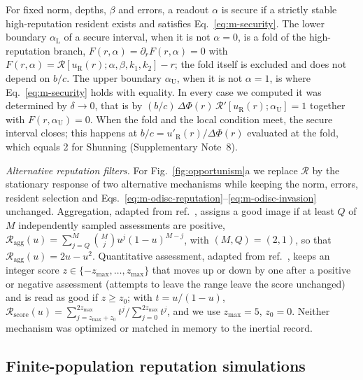 For fixed norm, depths, $\beta$ and errors, a readout $\alpha$ is secure if a
strictly stable high-reputation resident exists and satisfies
Eq.~\eqref{eq:m-security}. The lower boundary $\alpha_{\mathrm L}$ of a secure
interval, when it is not $\alpha=0$, is a fold of the high-reputation branch,
$F(r,\alpha)=\partial_rF(r,\alpha)=0$ with
$F(r,\alpha)=\mathcal R[u_{\mathrm R}(r);\alpha,\beta,k_1,k_2]-r$; the fold
itself is excluded and does not depend on $b/c$. The upper boundary
$\alpha_{\mathrm U}$, when it is not $\alpha=1$, is where
Eq.~\eqref{eq:m-security} holds with equality. In every case we computed it was
determined by $\delta\to0$, that is by
$(b/c)\,\Delta\Phi(r)\,\mathcal R'[u_{\mathrm R}(r);\alpha_{\mathrm U}]=1$
together with $F(r,\alpha_{\mathrm U})=0$. When the fold and the local condition
meet, the secure interval closes; this happens at
$b/c=u'_{\mathrm R}(r)/\Delta\Phi(r)$ evaluated at the fold, which equals 2 for
Shunning (Supplementary Note~8).

\textit{Alternative reputation filters.} For Fig.~\ref{fig:opportunism}a we
replace $\mathcal R$ by the stationary response of two alternative mechanisms
while keeping the norm, errors, resident selection and
Eqs.~\eqref{eq:m-odisc-reputation}--\eqref{eq:m-odisc-invasion} unchanged.
Aggregation, adapted from ref.~\cite{michelmata2024}, assigns a good image if at
least $Q$ of $M$ independently sampled assessments are positive,
$\mathcal R_{\mathrm{agg}}(u)=\sum_{j=Q}^{M}\binom Mj u^j(1-u)^{M-j}$, with
$(M,Q)=(2,1)$, so that $\mathcal R_{\mathrm{agg}}(u)=2u-u^2$. Quantitative
assessment, adapted from ref.~\cite{schmid2023}, keeps an integer score
$z\in\{-z_{\max},\dots,z_{\max}\}$ that moves up or down by one after a positive
or negative assessment (attempts to leave the range leave the score unchanged)
and is read as good if $z\ge z_0$; with $t=u/(1-u)$,
$\mathcal R_{\mathrm{score}}(u)=\sum_{j=z_{\max}+z_0}^{2z_{\max}}t^j\big/\sum_{j=0}^{2z_{\max}}t^j$,
and we use $z_{\max}=5$, $z_0=0$. Neither mechanism was optimized or matched in
memory to the inertial record.

\subsection*{Finite-population reputation simulations}

